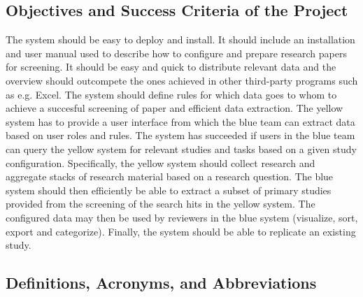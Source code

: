 \subsection{Objectives and Success Criteria of the Project}
The system should be easy to deploy and install. It should include an installation and user manual used to describe how to configure and prepare research papers for screening. It should be easy and quick to distribute relevant data and the overview should outcompete the ones achieved in other third-party programs such as e.g. Excel. The system should define rules for which data goes to whom to achieve a succesful screening of paper and efficient data extraction. The yellow system has to provide a user interface from which the blue team can extract data based on user roles and rules. The system has succeeded if users in the blue team can query the yellow system for relevant studies and tasks based on a given study configuration. Specifically, the yellow system should collect research and aggregate stacks of research material based on a research question. The blue system should then efficiently be able to extract a subset of primary studies provided from the screening of the search hits in the yellow system. The configured data may then be used by reviewers in the blue system (visualize, sort, export and categorize). Finally, the system should be able to replicate an existing study.

\newpage

\subsection{Definitions, Acronyms, and Abbreviations}

